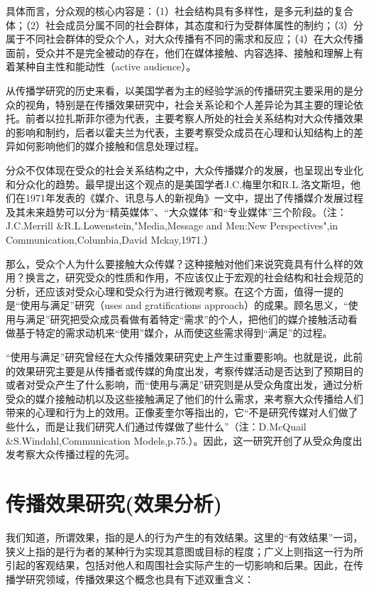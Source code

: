 \documentclass[UTF8,12pt]{ctexart}
\numberwithin{equation}{section} %
\numberwithin{figure}{section}
\numberwithin{table}{section}
\begin{document}
	具体而言，分众观的核心内容是：（1）社会结构具有多样性，是多元利益的复合体；（2）社会成员分属不同的社会群体，其态度和行为受群体属性的制约；（3）分属于不同社会群体的受众个人，对大众传播有不同的需求和反应；（4）在大众传播面前，受众并不是完全被动的存在，他们在媒体接触、内容选择、接触和理解上有着某种自主性和能动性（active audience）。
	
	从传播学研究的历史来看，以美国学者为主的经验学派的传播研究主要采用的是分众的视角，特别是在传播效果研究中，社会关系论和个人差异论为其主要的理论依托。前者以拉扎斯菲尔德为代表，主要考察人所处的社会关系结构对大众传播效果的影响和制约，后者以霍夫兰为代表，主要考察受众成员在心理和认知结构上的差异如何影响他们的媒介接触和信息处理过程。
	
	分众不仅体现在受众的社会关系结构之中，大众传播媒介的发展，也呈现出专业化和分众化的趋势。最早提出这个观点的是美国学者J.C.梅里尔和R.L.洛文斯坦，他们在1971年发表的《媒介、讯息与人的新视角》一文中，提出了传播媒介发展过程及其未来趋势可以分为“精英媒体”、“大众媒体”和“专业媒体”三个阶段。（注：J.C.Merrill \&R.L.Lowenstein,"Media,Message and Men:New Perspectives",in Communication,Columbia,David Mckay,1971.）
	
	那么，受众个人为什么要接触大众传媒？这种接触对他们来说究竟具有什么样的效用？换言之，研究受众的性质和作用，不应该仅止于宏观的社会结构和社会规范的分析，还应该对受众心理和受众行为进行微观考察。在这个方面，值得一提的是“使用与满足”研究（uses and gratifications approach）的成果。顾名思义，“使用与满足”研究把受众成员看做有着特定“需求”的个人，把他们的媒介接触活动看做基于特定的需求动机来“使用”媒介，从而使这些需求得到“满足”的过程。
	
	“使用与满足”研究曾经在大众传播效果研究史上产生过重要影响。也就是说，此前的效果研究主要是从传播者或传媒的角度出发，考察传媒活动是否达到了预期目的或者对受众产生了什么影响，而“使用与满足”研究则是从受众角度出发，通过分析受众的媒介接触动机以及这些接触满足了他们的什么需求，来考察大众传播给人们带来的心理和行为上的效用。正像麦奎尔等指出的，它“不是研究传媒对人们做了些什么，而是让我们研究人们通过传媒做了些什么”（注：D.McQuail \&S.Windahl,Communication Models,p.75.）。因此，这一研究开创了从受众角度出发考察大众传播过程的先河。
	
	\newpage
	
	\section{传播效果研究(效果分析)}
	我们知道，所谓效果，指的是人的行为产生的有效结果。这里的“有效结果”一词，狭义上指的是行为者的某种行为实现其意图或目标的程度；广义上则指这一行为所引起的客观结果，包括对他人和周围社会实际产生的一切影响和后果。因此，在传播学研究领域，传播效果这个概念也具有下述双重含义：
	
\end{document}
